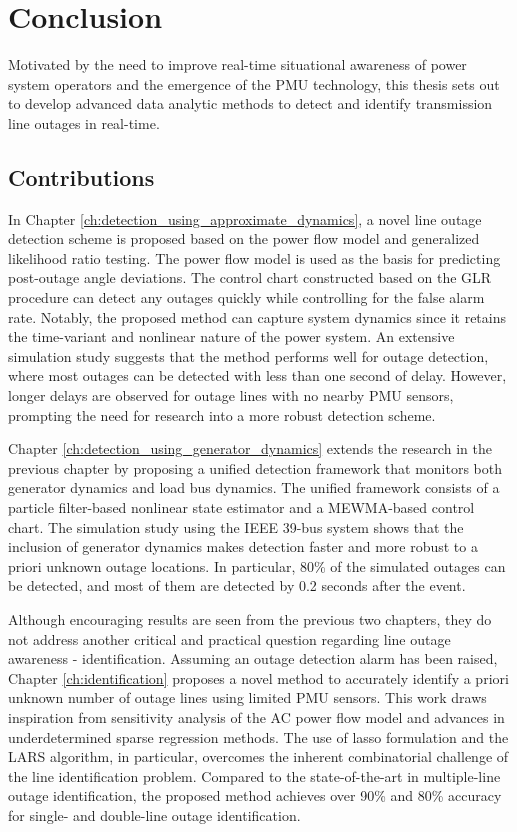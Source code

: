 \chapter{Conclusion}
\label{ch:conclusion}

Motivated by the need to improve real-time situational awareness of power system operators and the emergence of the PMU technology, this thesis sets out to develop advanced data analytic methods to detect and identify transmission line outages in real-time.


\section{Contributions}
In Chapter \ref{ch:detection_using_approximate_dynamics}, a novel line outage detection scheme is proposed based on the power flow model and generalized likelihood ratio testing. The power flow model is used as the basis for predicting post-outage angle deviations. The control chart constructed based on the GLR procedure can detect any outages quickly while controlling for the false alarm rate. Notably, the proposed method can capture system dynamics since it retains the time-variant and nonlinear nature of the power system. An extensive simulation study suggests that the method performs well for outage detection, where most outages can be detected with less than one second of delay. However, longer delays are observed for outage lines with no nearby PMU sensors, prompting the need for research into a more robust detection scheme.

Chapter \ref{ch:detection_using_generator_dynamics} extends the research in the previous chapter by proposing a unified detection framework that monitors both generator dynamics and load bus dynamics. The unified framework consists of a particle filter-based nonlinear state estimator and a MEWMA-based control chart. The simulation study using the IEEE 39-bus system shows that the inclusion of generator dynamics makes detection faster and more robust to a priori unknown outage locations. In particular, 80\% of the simulated outages can be detected, and most of them are detected by 0.2 seconds after the event. 

Although encouraging results are seen from the previous two chapters, they do not address another critical and practical question regarding line outage awareness - identification. Assuming an outage detection alarm has been raised, Chapter \ref{ch:identification} proposes a novel method to accurately identify a priori unknown number of outage lines using limited PMU sensors. This work draws inspiration from sensitivity analysis of the AC power flow model and advances in underdetermined sparse regression methods. The use of lasso formulation and the LARS algorithm, in particular, overcomes the inherent combinatorial challenge of the line identification problem. Compared to the state-of-the-art in multiple-line outage identification, the proposed method achieves over 90\% and 80\% accuracy for single- and double-line outage identification. 

